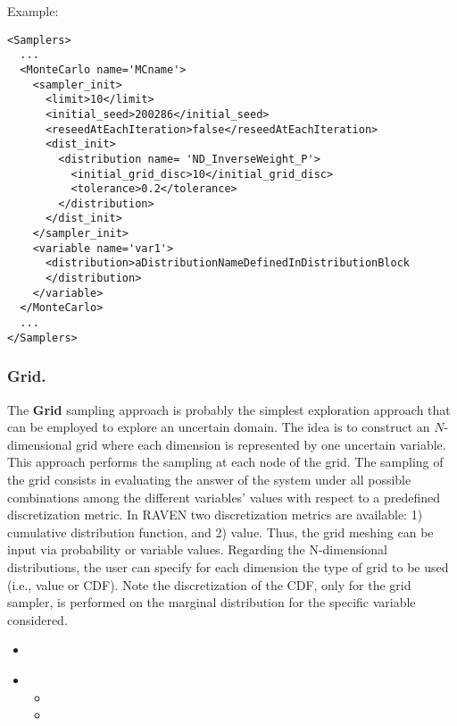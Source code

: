 Example:
\begin{lstlisting}[style=XML]
<Samplers>
  ...
  <MonteCarlo name='MCname'> 
    <sampler_init>
      <limit>10</limit>
      <initial_seed>200286</initial_seed>
      <reseedAtEachIteration>false</reseedAtEachIteration>
      <dist_init>
        <distribution name= 'ND_InverseWeight_P'>
          <initial_grid_disc>10</initial_grid_disc>
          <tolerance>0.2</tolerance>
        </distribution>
      </dist_init>
    </sampler_init>
    <variable name='var1'> 
      <distribution>aDistributionNameDefinedInDistributionBlock
      </distribution>  
    </variable> 
  </MonteCarlo>
  ...
</Samplers>
\end{lstlisting}

\subsubsection{Grid.}
\label{subsubsubsec:Grid}
The \textbf{Grid} sampling approach is probably the simplest exploration
approach that can be employed to explore an uncertain domain.
%
The idea is to construct an $N$-dimensional grid where each dimension is
represented by one uncertain variable.
%
This approach performs the sampling at each node of the grid.
%
The sampling of the grid consists in evaluating the answer of the system under
all possible combinations among the different variables' values with respect to
a predefined discretization metric.
%
In RAVEN two discretization metrics are available: 1) cumulative distribution
function, and 2) value.
%
Thus, the grid meshing can be input via probability or variable values.
%
Regarding the N-dimensional distributions, the user can specify for each dimension the type of grid to be used (i.e., value or CDF). Note the discretization of the CDF, only for the grid sampler, is performed on the marginal distribution for the specific variable considered.

%
\attrIntro
\begin{itemize}
\itemsep0em
\item \nameDescription
\end{itemize}
\begin{itemize}
\item \variableDescription
 \variableChildrenIntro
 \begin{itemize}
    \item \distributionDescription
    \item \gridDescription
  \end{itemize}
\end{itemize}

